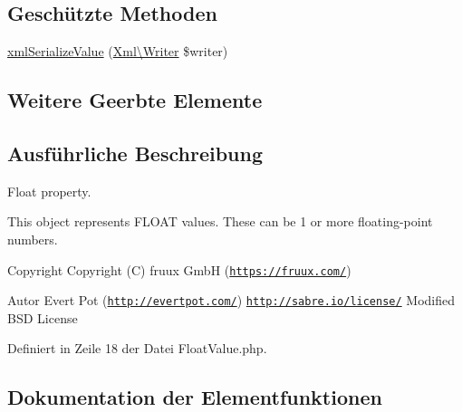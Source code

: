 \subsection*{Geschützte Methoden}
\begin{DoxyCompactItemize}
\item 
\mbox{\hyperlink{class_sabre_1_1_v_object_1_1_property_1_1_float_value_aa248cbb4b44304ab3e953b954046e798}{xml\+Serialize\+Value}} (\mbox{\hyperlink{class_sabre_1_1_xml_1_1_writer}{Xml\textbackslash{}\+Writer}} \$writer)
\end{DoxyCompactItemize}
\subsection*{Weitere Geerbte Elemente}


\subsection{Ausführliche Beschreibung}
Float property.

This object represents F\+L\+O\+AT values. These can be 1 or more floating-\/point numbers.

\begin{DoxyCopyright}{Copyright}
Copyright (C) fruux GmbH (\href{https://fruux.com/}{\tt https\+://fruux.\+com/}) 
\end{DoxyCopyright}
\begin{DoxyAuthor}{Autor}
Evert Pot (\href{http://evertpot.com/}{\tt http\+://evertpot.\+com/})  \href{http://sabre.io/license/}{\tt http\+://sabre.\+io/license/} Modified B\+SD License 
\end{DoxyAuthor}


Definiert in Zeile 18 der Datei Float\+Value.\+php.



\subsection{Dokumentation der Elementfunktionen}
\mbox{\label{class_sabre_1_1_v_object_1_1_property_1_1_float_value_aabf78b1baddaa8430aac6eb33e901a0b}} 

